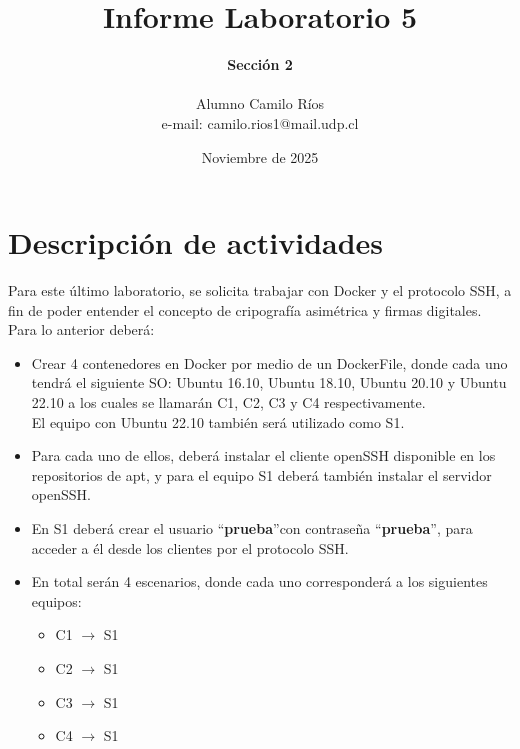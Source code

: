\documentclass[letter,12pt]{article}
\begin{document}
%
   \title{\Huge{Informe Laboratorio 5}}

   \author{\textbf{Sección 2} \\  \\Alumno Camilo Ríos \\ e-mail: camilo.rios1@mail.udp.cl}
          
   \date{Noviembre de 2025}

   \maketitle

   \newpage
   
   \tableofcontents
 
  \newpage
  

\section*{Descripción de actividades}
Para este último laboratorio, se solicita trabajar con Docker y el protocolo SSH, a fin de poder entender el concepto de cripografía asimétrica y firmas digitales.\\

Para lo anterior deberá:

\begin{itemize}
    \item Crear 4 contenedores en Docker por medio de un DockerFile, donde cada uno tendrá el siguiente SO:
        Ubuntu 16.10, Ubuntu 18.10, Ubuntu 20.10 y Ubuntu 22.10 a los cuales se llamarán C1, C2, C3 y C4 respectivamente.\\
        El equipo con Ubuntu 22.10 también será utilizado como S1.
        
    \item  Para cada uno de ellos, deberá instalar el cliente openSSH disponible en los repositorios de apt, y para el equipo S1 deberá también instalar el servidor openSSH.

    \item En S1 deberá crear el usuario \textquotedblleft\textbf{prueba}\textquotedblright con contraseña \textquotedblleft\textbf{prueba}\textquotedblright, para acceder a él desde los clientes por el protocolo SSH.
    
    \item En total serán 4 escenarios, donde cada uno corresponderá a los siguientes equipos:
    \begin{itemize}
        \item C1 $\rightarrow$ S1
        \item C2 $\rightarrow$ S1
        \item C3 $\rightarrow$ S1
        \item C4 $\rightarrow$ S1
    \end{itemize}
\end{itemize}
\end{document}
